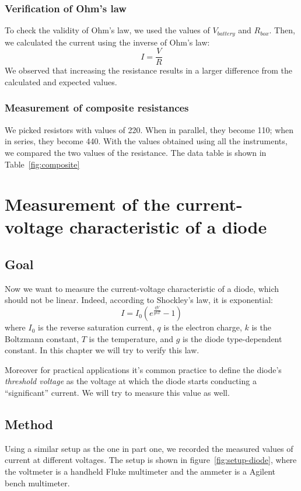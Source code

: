 \documentclass[notitlepage]{report}
\numberwithin{equation}{section}
\theoremstyle{plain}
\theoremstyle{definition}
\theoremstyle{remark}
\begin{document}
\subsection{Verification of Ohm’s law}
To check the validity of Ohm’s law, we used the values of $V_{battery}$ and $R_{box}$. Then, we calculated the current using the inverse of Ohm’s law:
\[ I = \frac{V}{R} \]
We observed that increasing the resistance results in a larger difference from the calculated and expected values.

\subsection{Measurement of composite resistances}
We picked resistors with values of 220. When in parallel, they become 110; when
in series, they become 440. With the values obtained using all the instruments,
we compared the two values of the resistance. The data table is shown in
Table~\ref{fig:composite}



\chapter{Measurement of the current-voltage characteristic of a diode}
\section{Goal}
Now we want to measure the current-voltage characteristic of a diode, which
should not be linear. Indeed, according to Shockley's law, it is exponential:
\[
    I = I_0 \left( e^{\frac{qV}{gkT}} - 1 \right)
\]
where $I_0$ is the reverse saturation current, $q$ is the electron charge, \(k\)
is the Boltzmann constant, \(T\) is the temperature, and \(g\) is the diode
type-dependent constant. In this chapter we will try to verify this law.

Moreover for practical applications it's common practice to define the diode's
\emph{threshold voltage} as the voltage at which the diode starts conducting a
``significant'' current. We will try to measure this value as well.

\section{Method}
Using a similar setup as the one in part one, we recorded the measured values of
current at different voltages. The setup is shown in
figure~\ref{fig:setup-diode}, where the voltmeter is a handheld Fluke
multimeter and the ammeter is a Agilent bench multimeter.
\end{document}
